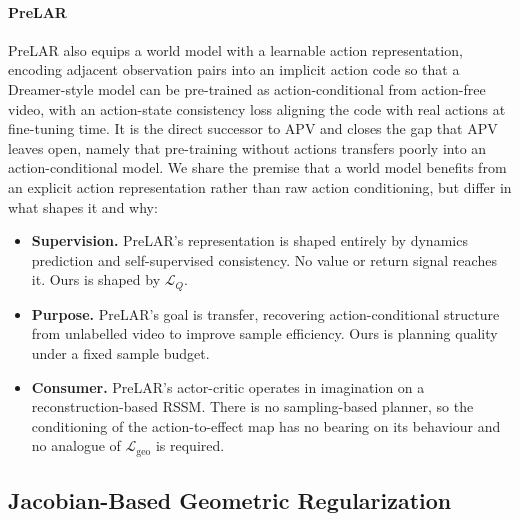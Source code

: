 ﻿\documentclass{article}
\begin{document}
\paragraph{PreLAR}
PreLAR also equips a world model with a learnable action representation, encoding
adjacent observation pairs into an implicit action code so that a Dreamer-style
model can be pre-trained as action-conditional from action-free video, with an
action-state consistency loss aligning the code with real actions at fine-tuning
time. It is the direct successor to APV and closes the gap that APV leaves open,
namely that pre-training without actions transfers poorly into an
action-conditional model. We share the premise that a world model benefits from an
explicit action representation rather than raw action conditioning, but differ in
what shapes it and why:
\begin{itemize}
  \item \textbf{Supervision.} PreLAR's representation is shaped entirely by
  dynamics prediction and self-supervised consistency. No value or return signal
  reaches it. Ours is shaped by $\mathcal{L}_Q$.
  \item \textbf{Purpose.} PreLAR's goal is transfer, recovering action-conditional
  structure from unlabelled video to improve sample efficiency. Ours is planning
  quality under a fixed sample budget.
  \item \textbf{Consumer.} PreLAR's actor-critic operates in imagination on a
  reconstruction-based RSSM. There is no sampling-based planner, so the
  conditioning of the action-to-effect map has no bearing on its behaviour and no
  analogue of $\mathcal{L}_{\mathrm{geo}}$ is required.
\end{itemize}

\subsection{Jacobian-Based Geometric Regularization}
\end{document}
